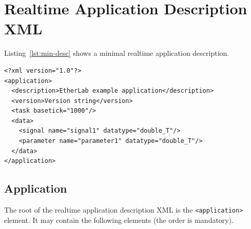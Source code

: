 
\section{Realtime Application Description XML}
\label{sec:xml}

Listing~\ref{lst:min-desc} shows a minimal realtime application description.

\begin{lstlisting}[caption={Minimal realtime application description},
    label={lst:min-desc}]
<?xml version="1.0"?>
<application>
  <description>EtherLab example application</description>
  <version>Version string</version>
  <task basetick="1000"/>
  <data>
    <signal name="signal1" datatype="double_T"/>
    <parameter name="parameter1" datatype="double_T"/>
  </data>
</application>
\end{lstlisting}


\subsection{Application}
\label{sec:xml-app}

The root of the realtime application description XML is the
\texttt{<application>} element. It may contain the following elements (the
order is mandatory).

